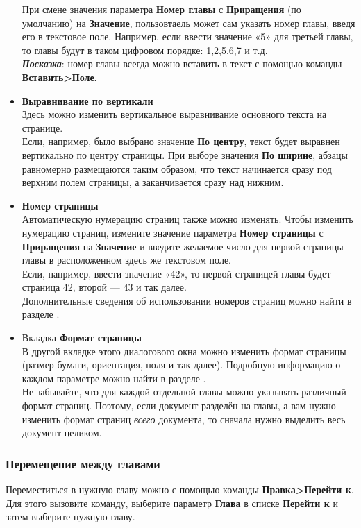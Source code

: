 ﻿\documentclass[a4paper,10pt]{article}
\begin{document}
\begin{itemize}
При смене значения параметра \textbf{Номер главы} с \textbf{Приращения} (по умолчанию) на \textbf{Значение}, пользовтаель может сам указать номер главы, введя его в текстовое поле. Например, если ввести значение «5» для третьей главы, то главы будут в таком цифровом порядке: 1,2,5,6,7 и т.д.\\
\textbf{\textit{Посказка}}: номер главы всегда можно вставить в текст с помощью команды \textbf{Вставить>Поле}.
\item \textbf{Выравнивание по вертикали}\\
Здесь можно изменить вертикальное выравнивание основного текста на странице.\\
Если,  например, было выбрано значение \textbf{По центру}, текст будет выравнен вертикально по центру страницы. При выборе значения \textbf{По ширине}, абзацы равномерно размещаются таким образом, что  текст начинается сразу под верхним полем страницы, а заканчивается сразу над нижним.
\item \textbf{Номер страницы}\\
Автоматическую нумерацию страниц также можно изменять. Чтобы изменить нумерацию страниц, измените значение параметра \textbf{Номер страницы} с \textbf{Приращения} на \textbf{Значение} и введите желаемое число для первой страницы главы в расположенном здесь же текстовом поле.\\
Если, например, ввести значение «42», то первой страницей главы будет страница 42, второй — 43 и так далее.\\
Дополнительные сведения об использовании номеров страниц можно найти в разделе .
\item Вкладка \textbf{Формат страницы}\\
В другой вкладке этого диалогового окна можно изменить формат страницы (размер бумаги, ориентация, поля и так далее). Подробную информацию о каждом параметре можно найти в разделе .\\
Не забывайте, что для каждой отдельной главы можно указывать различный формат страниц. Поэтому, если документ разделён на главы, а вам нужно изменить формат страниц \textit{всего} документа, то сначала нужно выделить весь документ целиком.
\end{itemize}

\subsubsection{Перемещение между главами}
Переместиться в нужную главу можно с помощью команды \textbf{Правка>Перейти к}. Для этого вызовите команду, выберите параметр \textbf{Глава} в списке \textbf{Перейти к} и затем выберите нужную главу.
\end{document}
